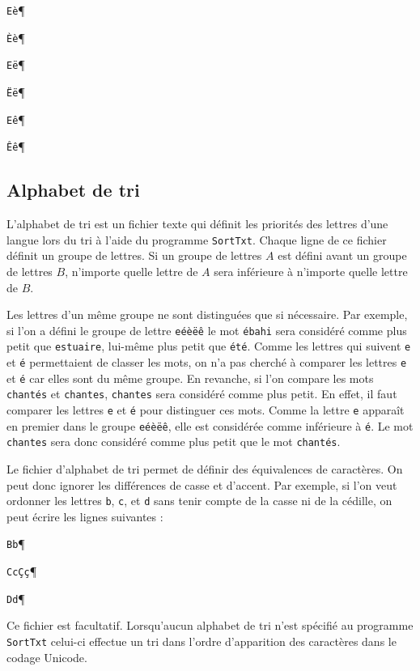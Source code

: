 \noindent
\texttt{Eè}\P

\noindent
\texttt{\`Eè}\P


\noindent
\texttt{Eë}\P

\noindent
\texttt{\"Eë}\P

\noindent
\texttt{Eê}\P

\noindent
\texttt{\^Eê}\P

\subsection{Alphabet de tri}
L’alphabet de tri est un fichier texte qui définit les priorités des lettres d’une langue lors
du tri à l’aide du programme \verb+SortTxt+. Chaque ligne de ce fichier définit un groupe de lettres. Si un groupe de
lettres $A$ est défini avant un groupe de lettres $B$, n’importe quelle lettre de $A$ sera
inférieure à n’importe quelle lettre de $B$.

\bigskip
\noindent Les lettres d’un même groupe ne sont distinguées que si nécessaire. Par exemple, si
l’on a défini le groupe de lettre \verb+eéèëê+ le mot \verb+ébahi+ sera considéré
comme plus petit que \verb+estuaire+, lui-même plus petit que \verb+été+. Comme les lettres
qui suivent \verb+e+ et \verb+é+  permettaient de classer les mots, on n’a pas cherché à comparer
les lettres \verb+e+ et \verb+é+ car elles sont du même groupe.
En revanche, si l’on compare les mots \verb+chantés+ et \verb+chantes+, \verb+chantes+                                                          sera considéré comme plus petit. En effet, il faut comparer les lettres \verb+e+ et  \verb+é+ pour distinguer ces mots. Comme la lettre \verb+e+ apparaît en premier dans le groupe \verb+eéèëê+, elle est considérée comme inférieure à \verb+é+. Le mot \verb+chantes+ sera donc considéré comme plus petit que le mot \verb+chantés+.

\bigskip
\noindent Le fichier d’alphabet de tri permet de définir des équivalences de caractères. On peut
donc ignorer les différences de casse et d’accent. Par exemple, si l’on veut ordonner les lettres
\verb+b+, \verb+c+, et \verb+d+ sans tenir compte de la casse ni de la cédille, on peut écrire les
lignes suivantes :

\bigskip
\noindent
\texttt{Bb}\P

\noindent
\texttt{Cc\c{C}\c{c}}\P

\noindent
\texttt{Dd}\P

\bigskip
\noindent Ce fichier est facultatif. Lorsqu’aucun alphabet de tri n’est spécifié au programme 
\verb+SortTxt+ celui-ci effectue un tri dans l’ordre d’apparition des caractères dans le codage Unicode.


